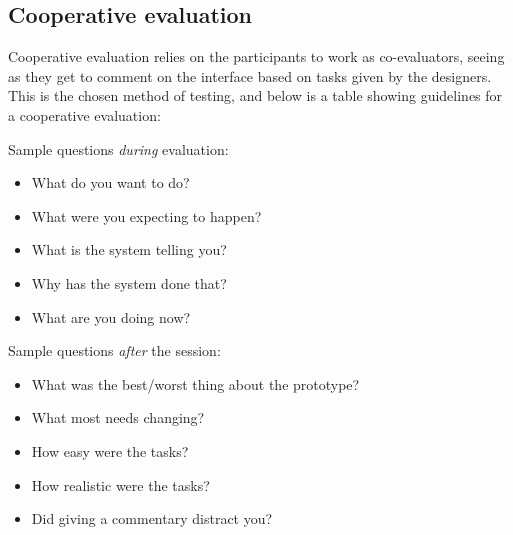 \subsection{Cooperative evaluation}
Cooperative evaluation relies on the participants to work as co-evaluators, seeing as they get to comment on the interface based on tasks given by the designers. This is the chosen method of testing, and below is a table showing guidelines for a cooperative evaluation:


Sample questions \textsl{during} evaluation:
\begin{itemize}
	\item What do you want to do?
	\item What were you expecting to happen?
	\item What is the system telling you?
	\item Why has the system done that?
	\item What are you doing now?
\end{itemize}

Sample questions \textsl{after} the session:
\begin{itemize}
	\item What was the best/worst thing about the prototype?
	\item What most needs changing?
	\item How easy were the tasks?
	\item How realistic were the tasks?
	\item Did giving a commentary distract you?
\end{itemize}\cite{Benyon10} 